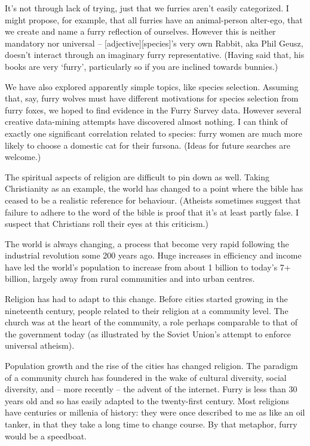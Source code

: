 It's not through lack of trying, just that we furries aren't easily categorized. I might propose, for example, that all furries have an animal-person alter-ego, that we create and name a furry reflection of ourselves. However this is neither mandatory nor universal -- [adjective][species]'s very own Rabbit, aka Phil Geusz, doesn't interact through an imaginary furry representative. (Having said that, his books are very `furry', particularly so if you are inclined towards bunnies.)

We have also explored apparently simple topics, like species selection. Assuming that, say, furry wolves must have different motivations for species selection from furry foxes, we hoped to find evidence in the Furry Survey data. However several creative data-mining attempts have discovered almost nothing. I can think of exactly one significant correlation related to species: furry women are much more likely to choose a domestic cat for their fursona. (Ideas for future searches are welcome.)

The spiritual aspects of religion are difficult to pin down as well. Taking Christianity as an example, the world has changed to a point where the bible has ceased to be a realistic reference for behaviour. (Atheists sometimes suggest that failure to adhere to the word of the bible is proof that it's at least partly false. I suspect that Christians roll their eyes at this criticism.)

The world is always changing, a process that become very rapid following the industrial revolution some 200 years ago. Huge increases in efficiency and income have led the world's population to increase from about 1 billion to today's 7+ billion, largely away from rural communities and into urban centres.

Religion has had to adapt to this change. Before cities started growing in the nineteenth century, people related to their religion at a community level. The church was at the heart of the community, a role perhaps comparable to that of the government today (as illustrated by the Soviet Union's attempt to enforce universal atheism).

Population growth and the rise of the cities has changed religion. The paradigm of a community church has foundered in the wake of cultural diversity, social diversity, and -- more recently -- the advent of the internet. Furry is less than 30 years old and so has easily adapted to the twenty-first century. Most religions have centuries or millenia of history: they were once described to me as like an oil tanker, in that they take a long time to change course. By that metaphor, furry would be a speedboat.

